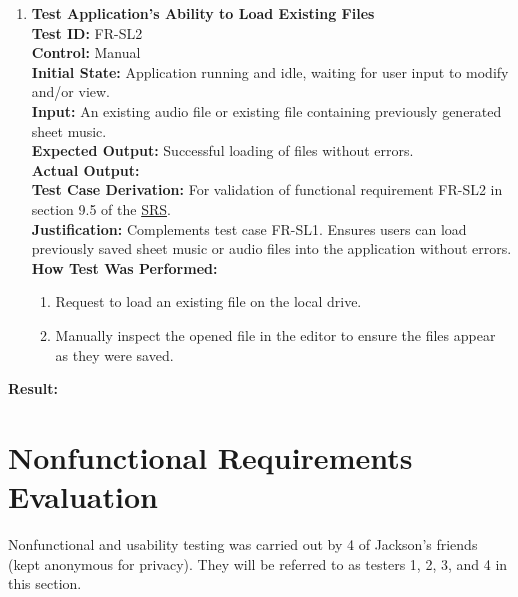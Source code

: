 \documentclass[12pt, titlepage]{article}
\begin{document}
\begin{enumerate}
    \item \textbf{Test Application’s Ability to Load Existing Files} \\
      \newline
      \textbf{Test ID:} FR-SL2 \\
      \textbf{Control:} Manual \\
      \textbf{Initial State:} Application running and idle, waiting for user input to modify and/or view. \\
      \textbf{Input:} An existing audio file or existing file containing previously generated sheet music. \\
      \textbf{Expected Output:} Successful loading of files without errors. \\
      \textbf{Actual Output:} \\
      \textbf{Test Case Derivation:} For validation of functional requirement FR-SL2 in section 9.5 of the 
      \href{https://github.com/emilyperica/ScoreGen/blob/main/docs/SRS-Volere/SRS.pdf}{SRS}. \\
      \textbf{Justification:} Complements test case FR-SL1. Ensures users can load previously saved sheet music or 
      audio files into the application without errors.\\
      \textbf{How Test Was Performed:}
      \begin{enumerate}
          \item Request to load an existing file on the local drive.
          \item Manually inspect the opened file in the editor to ensure the files appear as they were saved.
      \end{enumerate}
  \end{enumerate}
  \textbf{Result:}

\section{Nonfunctional Requirements Evaluation}
Nonfunctional and usability testing was carried out by 4 of Jackson's friends (kept anonymous for privacy). 
They will be referred to as testers 1, 2, 3, and 4 in this section.
\end{document}
